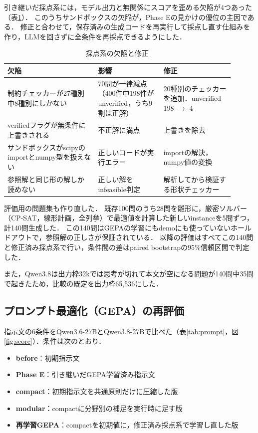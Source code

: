 \documentclass[12pt,a4paper]{article}
\begin{document}
引き継いだ採点系には，モデル出力と無関係にスコアを歪める欠陥が4つあった（表\ref{tab:scorer}）．
このうちサンドボックスの欠陥が，Phase Eの見かけの優位の主因である．
修正と合わせて，保存済みの生成コードを再実行して採点し直す仕組みを作り，LLMを回さずに全条件を再採点できるようにした．

\begin{table}[H]
  \centering
  \caption{採点系の欠陥と修正}
  \label{tab:scorer}
  \small
  \begin{tabular}{p{0.36\linewidth}p{0.26\linewidth}p{0.28\linewidth}}
    \toprule
    欠陥 & 影響 & 修正 \\
    \midrule
    制約チェッカーが27種別中8種別にしかない & 70問が一律減点（400件中198件がunverified，うち9割は正解） & 20種別のチェッカーを追加．unverified 198 $\rightarrow$ 4 \\
    verifiedフラグが無条件に上書きされる & 不正解に満点 & 上書きを除去 \\
    サンドボックスがscipyのimportとnumpy型を扱えない & 正しいコードが実行エラー & importの解決，numpy値の変換 \\
    参照解と同じ形の解しか読めない & 正しい解をinfeasible判定 & 解析してから検証する形状チェッカー \\
    \bottomrule
  \end{tabular}
\end{table}

評価用の問題集も作り直した．
既存100問のうち28問を雛形に，厳密ソルバー（CP-SAT，線形計画，全列挙）で最適値を計算した新しいinstanceを5問ずつ，計140問生成した．
この140問はGEPAの学習にもdemoにも使っていないホールドアウトで，参照解の正しさが保証されている．
以降の評価はすべてこの140問と修正済み採点系で行い，条件間の差はpaired bootstrapの95\%信頼区間で判定した．

また，Qwen3.8は出力枠32kでは思考が切れて本文が空になる問題が140問中35問で起きたため，比較の既定を出力枠65,536にした．


\subsection{プロンプト最適化（GEPA）の再評価}

指示文の6条件をQwen3.6-27BとQwen3.8-27Bで比べた（表\ref{tab:prompt}，図\ref{fig:score}）．条件は次のとおり．

\begin{itemize}
  \item \textbf{before}：初期指示文
  \item \textbf{Phase E}：引き継いだGEPA学習済み指示文
  \item \textbf{compact}：初期指示文を共通原則だけに圧縮した版
  \item \textbf{modular}：compactに分野別の補足を実行時に足す版
  \item \textbf{再学習GEPA}：compactを初期値に，修正済み採点系で学習し直した版
\end{itemize}
\end{document}
